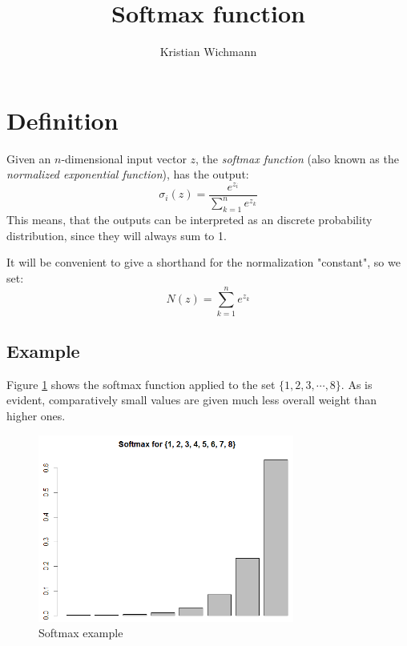\documentclass[12pt, a4paper]{article}
\title{Softmax function}
\author{Kristian Wichmann}
\numberwithin{equation}{section}
\begin{document}
\maketitle

\section{Definition}
Given an $n$-dimensional input vector $z$, the \textit{softmax function} (also known as the \textit{normalized exponential function}), has the output:
\begin{equation}
\sigma_i(z)=\frac{e^{z_i}}{\sum_{k=1}^n e^{z_k}}
\end{equation}
This means, that the outputs can be interpreted as an discrete probability distribution, since they will always sum to 1.

It will be convenient to give a shorthand for the normalization "constant", so we set:
\begin{equation}
N(z)=\sum_{k=1}^n e^{z_k}
\end{equation}

\subsection{Example}
Figure \ref{fig:softmax_example} shows the softmax function applied to the set $\{1, 2, 3,\cdots, 8\}$. As is evident, comparatively small values are given much less overall weight than higher ones.

\begin{figure}
\centering
\includegraphics[width=0.75\textwidth]{softmax_example}
\caption{Softmax example}
\label{fig:softmax_example}
\end{figure}
\end{document}
